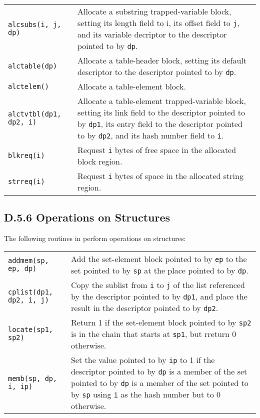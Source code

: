 {\begin{xtabular}{>{\hspace{1cm}\texttt\bgroup}l<{\egroup}@{\hspace{1cm}}p{11cm}}
alcsubs(i, j, dp) &
Allocate a substring trapped-variable block, setting its length field to
i, its offset field to \texttt{j}, and its variable decriptor to the
descriptor pointed to by \texttt{dp}.\\

alctable(dp) &
Allocate a table-header block, setting its default descriptor to the descriptor
pointed to by \texttt{dp}.\\

alctelem() &
Allocate a table-element block.\\

alctvtbl(dp1, dp2, i) &
Allocate a table-element trapped-variable block, setting its link field to the
descriptor pointed to by \texttt{dp1}, its entry field to the descriptor pointed
to by \texttt{dp2}, and its hash number field to \texttt{i}.\\

blkreq(i) &
Request \texttt{i} bytes of free space in the allocated block region.\\

\texttt{strreq(i)} &
Request \texttt{i} bytes of space in the allocated string region.\\

\end{xtabular}
}

\subsection[D.5.6 Operations on Structures]{D.5.6 Operations on Structures}

The following routines in  perform operations on structures:

\begin{xtabular}{l@{\hspace{1cm}}p{11cm}}

\texttt{addmem(sp, ep, dp)} &
Add the set-element block pointed to by \texttt{ep} to the set pointed to by
\texttt{sp} at the place pointed to by \texttt{dp}.\\

\texttt{cplist(dp1, dp2, i, j)} &
Copy the sublist from \texttt{i} to \texttt{j} of the list referenced by the
descriptor pointed to by \texttt{dp1}, and place the result in the descriptor
pointed to by \texttt{dp2}.\\

\texttt{{\color{red}locate}(sp1, sp2)} &
Return 1 if the set-element block pointed to by \texttt{sp2} is in the chain
that starts at \texttt{sp1}, but rreturn 0 otherwise.\\

\texttt{memb(sp, dp, i, ip)} &
Set the value pointed to by \texttt{ip} to 1 if the descriptor pointed to by
\texttt{dp} is a member of the set pointed to by \texttt{dp} is a member of the
set pointed to by \texttt{sp} using \texttt{i} as the hash number but to 0
otherwise.\\

\end{xtabular}

